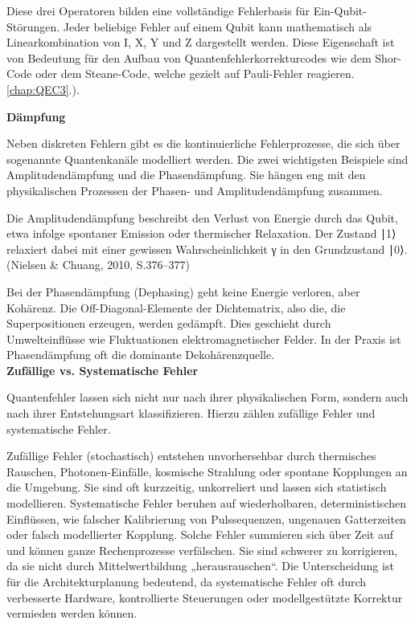 Diese drei Operatoren bilden eine vollständige Fehlerbasis für Ein-Qubit-Störungen. Jeder beliebige Fehler auf einem Qubit kann mathematisch als Linearkombination von I, X, Y und Z dargestellt werden. Diese Eigenschaft ist von Bedeutung für den Aufbau von Quantenfehlerkorrekturcodes wie dem Shor-Code oder dem Steane-Code, welche gezielt auf Pauli-Fehler reagieren. \ref{chap:QEC3}.). \cite[Seite 252-253]{rieffel_eleanor_g_and_wolfgang_h_polak_quantum_2011}


\textbf{Dämpfung}

Neben diskreten Fehlern gibt es die kontinuierliche Fehlerprozesse, die sich über sogenannte Quantenkanäle modelliert werden. Die zwei wichtigsten Beispiele sind Amplitudendämpfung und die Phasendämpfung. Sie hängen eng mit den physikalischen Prozessen der Phasen- und Amplitudendämpfung zusammen.

Die Amplitudendämpfung beschreibt den Verlust von Energie durch das Qubit, etwa infolge spontaner Emission oder thermischer Relaxation. Der Zustand ∣1⟩ relaxiert dabei mit einer gewissen Wahrscheinlichkeit γ in den Grundzustand ∣0⟩. \cite[Seite 380-383]{nielsen_quantum_2010}\\
(Nielsen & Chuang, 2010, S.376–377)

Bei der Phasendämpfung (Dephasing) geht keine Energie verloren, aber Kohärenz. Die Off-Diagonal-Elemente der Dichtematrix, also die, die Superpositionen erzeugen, werden gedämpft. Dies geschieht durch Umwelteinflüsse wie Fluktuationen elektromagnetischer Felder. In der Praxis ist Phasendämpfung oft die dominante Dekohärenzquelle. \cite[Seite 383-386]{nielsen_quantum_2010}\\


\textbf{Zufällige vs. Systematische Fehler}

Quantenfehler lassen sich nicht nur nach ihrer physikalischen Form, sondern auch nach ihrer Entstehungsart klassifizieren. Hierzu zählen zufällige Fehler und systematische Fehler.

Zufällige Fehler (stochastisch) entstehen unvorhersehbar durch thermisches Rauschen, Photonen-Einfälle, kosmische Strahlung oder spontane Kopplungen an die Umgebung. Sie sind oft kurzzeitig, unkorreliert und lassen sich statistisch modellieren.
Systematische Fehler beruhen auf wiederholbaren, deterministischen Einflüssen, wie falscher Kalibrierung von Pulssequenzen, ungenauen Gatterzeiten oder falsch modellierter Kopplung. Solche Fehler summieren sich über Zeit auf und können ganze Rechenprozesse verfälschen. Sie sind schwerer zu korrigieren, da sie nicht durch Mittelwertbildung „herausrauschen“.\cite[Seite 3-5]{Quantum error correction below the surface code threshold_2024}
Die Unterscheidung ist für die Architekturplanung bedeutend, da systematische Fehler oft durch verbesserte Hardware, kontrollierte Steuerungen oder modellgestützte Korrektur vermieden werden können.

